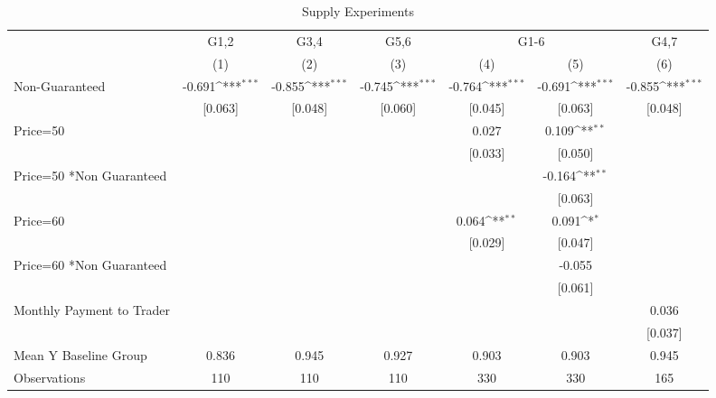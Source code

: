 {
\def\sym#1{\ifmmode^{#1}\else\(^{#1}\)\fi}
\begin{longtable}{l*{6}{c}}
\caption{Supply Experiments \label{tab:lif}}\\
\hline\hline\endfirsthead\hline\endhead\hline\endfoot\endlastfoot
                &\multicolumn{1}{c}{G1,2}&\multicolumn{1}{c}{G3,4}&\multicolumn{1}{c}{G5,6}&\multicolumn{2}{c}{G1-6}             &\multicolumn{1}{c}{G4,7}\\\cmidrule(lr){2-2}\cmidrule(lr){3-3}\cmidrule(lr){4-4}\cmidrule(lr){5-6}\cmidrule(lr){7-7}
                &\multicolumn{1}{c}{(1)}         &\multicolumn{1}{c}{(2)}         &\multicolumn{1}{c}{(3)}         &\multicolumn{1}{c}{(4)}         &\multicolumn{1}{c}{(5)}         &\multicolumn{1}{c}{(6)}         \\
\hline
Non-Guaranteed  &   -0.691\sym{***}&   -0.855\sym{***}&   -0.745\sym{***}&   -0.764\sym{***}&   -0.691\sym{***}&   -0.855\sym{***}\\
                &  [0.063]         &  [0.048]         &  [0.060]         &  [0.045]         &  [0.063]         &  [0.048]         \\
Price=50        &                  &                  &                  &    0.027         &    0.109\sym{**} &                  \\
                &                  &                  &                  &  [0.033]         &  [0.050]         &                  \\
Price=50 *Non Guaranteed&                  &                  &                  &                  &   -0.164\sym{**} &                  \\
                &                  &                  &                  &                  &  [0.063]         &                  \\
Price=60        &                  &                  &                  &    0.064\sym{**} &    0.091\sym{*}  &                  \\
                &                  &                  &                  &  [0.029]         &  [0.047]         &                  \\
Price=60 *Non Guaranteed&                  &                  &                  &                  &   -0.055         &                  \\
                &                  &                  &                  &                  &  [0.061]         &                  \\
Monthly Payment to Trader&                  &                  &                  &                  &                  &    0.036         \\
                &                  &                  &                  &                  &                  &  [0.037]         \\
\hline
Mean Y Baseline Group&    0.836         &    0.945         &    0.927         &    0.903         &    0.903         &    0.945         \\
Observations    &      110         &      110         &      110         &      330         &      330         &      165         \\
\hline\hline
\end{longtable}
}
